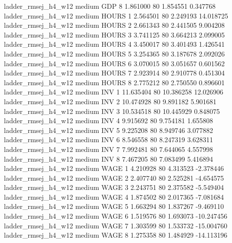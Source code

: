 ladder_rmsej_h4_w12     medium      GDP                 8  1.861000 80       1.854551           0.347768
ladder_rmsej_h4_w12     medium    HOURS                 1  2.564501 80       2.249193          14.018725
ladder_rmsej_h4_w12     medium    HOURS                 2  2.661343 80       2.441505           9.004208
ladder_rmsej_h4_w12     medium    HOURS                 3  3.741125 80       3.664213           2.099005
ladder_rmsej_h4_w12     medium    HOURS                 4  3.450017 80       3.401493           1.426541
ladder_rmsej_h4_w12     medium    HOURS                 5  3.254365 80       3.187678           2.092026
ladder_rmsej_h4_w12     medium    HOURS                 6  3.070015 80       3.051657           0.601562
ladder_rmsej_h4_w12     medium    HOURS                 7  2.923914 80       2.910778           0.451304
ladder_rmsej_h4_w12     medium    HOURS                 8  2.775212 80       2.750550           0.896601
ladder_rmsej_h4_w12     medium      INV                 1 11.635404 80      10.386258          12.026906
ladder_rmsej_h4_w12     medium      INV                 2 10.474928 80       9.891182           5.901681
ladder_rmsej_h4_w12     medium      INV                 3 10.534518 80      10.445929           0.848075
ladder_rmsej_h4_w12     medium      INV                 4  9.915692 80       9.754181           1.655808
ladder_rmsej_h4_w12     medium      INV                 5  9.225208 80       8.949746           3.077882
ladder_rmsej_h4_w12     medium      INV                 6  8.546558 80       8.247319           3.628311
ladder_rmsej_h4_w12     medium      INV                 7  7.992481 80       7.644065           4.557998
ladder_rmsej_h4_w12     medium      INV                 8  7.467205 80       7.083499           5.416894
ladder_rmsej_h4_w12     medium     WAGE                 1  4.210928 80       4.313523          -2.378446
ladder_rmsej_h4_w12     medium     WAGE                 2  2.407740 80       2.525281          -4.654575
ladder_rmsej_h4_w12     medium     WAGE                 3  2.243751 80       2.375582          -5.549404
ladder_rmsej_h4_w12     medium     WAGE                 4  1.874502 80       2.017365          -7.081684
ladder_rmsej_h4_w12     medium     WAGE                 5  1.663294 80       1.837267          -9.469110
ladder_rmsej_h4_w12     medium     WAGE                 6  1.519576 80       1.693073         -10.247456
ladder_rmsej_h4_w12     medium     WAGE                 7  1.303599 80       1.533732         -15.004760
ladder_rmsej_h4_w12     medium     WAGE                 8  1.275358 80       1.484929         -14.113196
